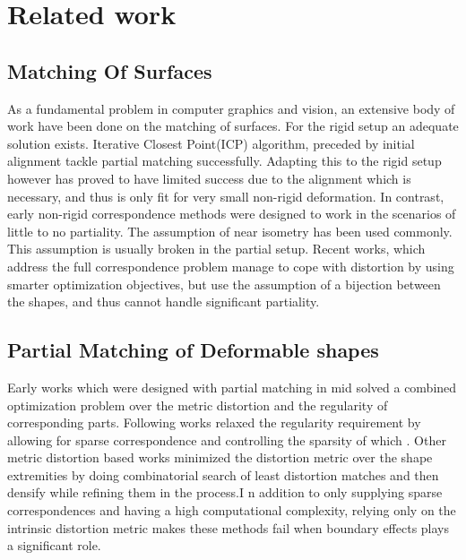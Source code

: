 \documentclass[10pt,twocolumn,letterpaper]{article}
\begin{document}
\section{Related work}\label{chap:related work}


\subsection{Matching Of Surfaces}
As a fundamental problem in computer graphics and vision, an extensive body of work have been done on the matching of surfaces.
For the rigid setup an adequate solution exists. Iterative Closest Point(ICP)\cite{Aiger:2008:CSR:1360612.1360684} algorithm, preceded by initial alignment\cite{rusu2008towards} tackle partial matching successfully. Adapting this to the rigid setup however has proved to have limited success due to the alignment which is necessary, and thus is only fit for very small non-rigid deformation.
In contrast, early non-rigid correspondence methods were designed to work in the scenarios of little to no partiality. The assumption of near isometry\cite{bronstein2006generalized} has been used commonly. This assumption is usually broken in the partial setup. Recent works, which address the full correspondence problem\cite{aigerman2015seamless,maron2016point,solomon2016entropic,vestner2017product} manage to cope with distortion by using smarter optimization objectives, but use the assumption of a bijection between the shapes, and thus cannot handle significant partiality.
\subsection{Partial Matching of Deformable shapes}
Early works which were designed with partial matching in mid\cite{bronstein2008not,bronstein2009partial} solved a combined optimization problem over the metric distortion and the regularity of corresponding parts. Following works relaxed the regularity requirement by allowing for sparse correspondence\cite{Torsello:2012:GAD:2354409.2354702} and controlling the sparsity of which \cite{rodola2013elastic}. Other metric distortion based works\cite{sahilliouglu2012scale,sahilliouglu2014multiple} minimized the distortion metric over the shape extremities by doing combinatorial search of least distortion matches and then densify while refining them in the process.I n addition to only supplying sparse correspondences and having a high computational complexity, relying only on the intrinsic distortion metric makes these methods fail when boundary effects plays a significant role.
\end{document}
